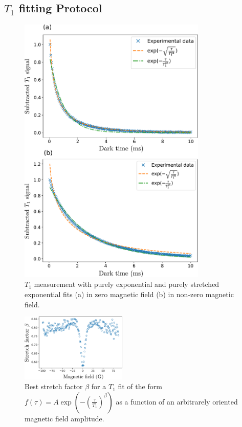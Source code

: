 \documentclass[preprintnumbers,amsmath,amssymb,onecolumn,12pt]{revtex4-2}\usepackage{graphicx}%
\begin{document}
\subsection{$T_1$ fitting Protocol}
\begin{figure}
\includegraphics[width=0.8\textwidth]{Figures_SI/Fig_T1_combined}
\caption{$T_1$ measurement with purely exponential and purely stretched exponential fits (a) in zero magnetic field (b) in non-zero magnetic field.}
\label{T1_fits}
\end{figure}
\begin{figure}[h]
\includegraphics[width=0.45\textwidth]{Figures_SI/fig_alphas}
\caption{Best stretch factor $\beta$ for a $T_1$ fit of the form $f(\tau)=A \exp(-(\frac{\tau}{T_1})^\beta)$ as a function of an arbitrarely oriented magnetic field amplitude.}
\label{alphas}
\end{figure}
\end{document}
